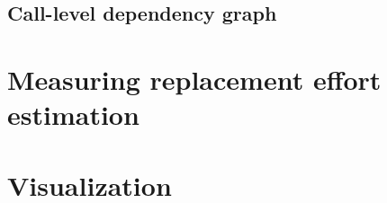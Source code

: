 \subsection{Call-level dependency graph}


\section{Measuring replacement effort estimation}

\section{Visualization}
